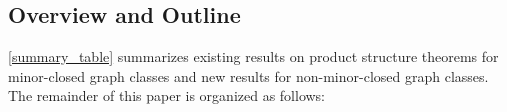 \documentclass{patmorin}
\theoremstyle{plain}
\newtheorem{thm}{Theorem}
\theoremstyle{definition}
\newcommand{\defin}[1]{\textcolor{Maroon}{\emph{#1}}}
\DeclareMathOperator{\dist}{dist}
\renewcommand{\SS}{\mathcal{S}}
\renewcommand{\geq}{\geqslant}
\renewcommand{\leq}{\leqslant}
\begin{document}




\subsection{Overview and Outline}

\cref{summary_table} summarizes existing results on product structure theorems for minor-closed graph classes and new results for non-minor-closed graph classes.  The remainder of this paper is organized as follows:
\end{document}
